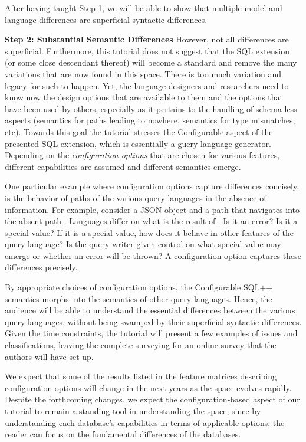 After having taught Step 1, we will be able to show that multiple model and language differences are superficial syntactic differences.

\noindent \textbf{Step 2: Substantial Semantic Differences} However, not all differences are superficial. Furthermore, this tutorial does not suggest that the SQL extension (or some close descendant thereof) will become a standard and remove the many variations that are now found in this space. There is too much variation and legacy for such to happen. Yet, the language designers and researchers need to know now the design options that are available to them and the options that have been used by others, especially as it pertains to the handling of schema-less aspects (semantics for paths leading to nowhere, semantics for type mismatches, etc). 
Towards this goal the tutorial stresses the Configurable aspect of the presented SQL extension, which is essentially a guery language generator. Depending on the \textit{ configuration options} that are chosen for various features, different capabilities are assumed and different semantics emerge.

One particular example where configuration options capture differences concisely, is the behavior of paths of the various query languages in the absence of information. For example, consider a JSON object  and a path that navigates into the absent path . Languages differ on what is the result of . Is it an error? Is it a special value? If it is a special value, how does it behave in other features of the query language? Is the query writer given control on what special value may emerge or whether an error will be thrown? A configuration option captures these differences precisely. 

By appropriate choices of configuration options, the Configurable SQL++ semantics morphs into the semantics of other query languages. Hence, the audience will be able to understand the essential differences between the various query languages, without being swamped by their superficial syntactic differences. Given the time constraints, the tutorial will present a few examples of issues and classifications, leaving the complete surveying for an online survey that the authors will have set up.  

We expect that some of the results listed in the feature matrices describing configuration options will change in the next years as the space evolves rapidly.
Despite the forthcoming changes, we expect the configuration-based aspect of our tutorial to remain a standing tool in understanding the space, since by understanding each database's capabilities in terms of applicable options, the reader can focus on the fundamental differences of the databases. 

